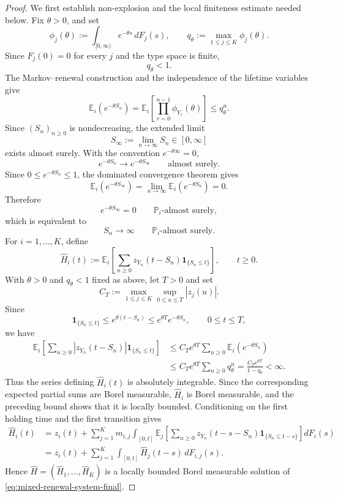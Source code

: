 \documentclass[10pt,a4paper]{amsart}
\newcommand{\E}{\mathbb E}
\newcommand{\Pbb}{\mathbb P}
\newcommand{\ind}[1]{\mathbf 1_{\{#1\}}}
\begin{document}
\begin{proof}
We first establish non-explosion and the local finiteness estimate needed below. Fix \(\theta>0\), and set
\[
  \phi_j(\theta):=
  \int_{[0,\infty)}e^{-\theta s}\,dF_j(s),
  \qquad
  q_\theta:=\max_{1\le j\le K}\phi_j(\theta).
\]
Since \(F_j(0)=0\) for every \(j\) and the type space is finite,
\[
  q_\theta<1.
\]
The Markov--renewal construction and the independence of the lifetime variables give
\[
  \E_i\left(e^{-\theta S_n}\right)
  =
  \E_i\left[
    \prod_{r=0}^{n-1}\phi_{Y_r}(\theta)
  \right]
  \le q_\theta^n.
\]
Since \((S_n)_{n\ge0}\) is nondecreasing, the extended limit
\[
  S_\infty:=\lim_{n\to\infty}S_n
  \in[0,\infty]
\]
exists almost surely. With the convention \(e^{-\theta\infty}=0\),
\[
  e^{-\theta S_n}\longrightarrow e^{-\theta S_\infty}
  \qquad\text{almost surely}.
\]
Since \(0\le e^{-\theta S_n}\le1\), the dominated convergence theorem gives
\[
  \E_i\left(e^{-\theta S_\infty}\right)
  =
  \lim_{n\to\infty}\E_i\left(e^{-\theta S_n}\right)
  =0.
\]
Therefore
\[
  e^{-\theta S_\infty}=0
  \qquad \Pbb_i\text{-almost surely},
\]
which is equivalent to
\[
  S_n\longrightarrow\infty
  \qquad \Pbb_i\text{-almost surely}.
\]
For \(i=1,\dots,K\), define
\[
  \widehat H_i(t):=
  \E_i\left[
    \sum_{n\ge0}
    z_{Y_n}(t-S_n)\ind{S_n\le t}
  \right],
  \qquad t\ge0.
\]
With \(\theta>0\) and \(q_\theta<1\) fixed as above, let \(T>0\) and set
\[
  C_T:=
  \max_{1\le j\le K}\sup_{0\le u\le T}|z_j(u)|.
\]
Since
\[
  \ind{S_n\le t}
  \le e^{\theta(t-S_n)}
  \le e^{\theta T}e^{-\theta S_n},
  \qquad 0\le t\le T,
\]
we have
\[
\begin{split}
  \E_i\left[
    \sum_{n\ge0}
    |z_{Y_n}(t-S_n)|\ind{S_n\le t}
  \right]
  &\le
  C_Te^{\theta T}
  \sum_{n\ge0}\E_i\left(e^{-\theta S_n}\right)\\
  &\le
  C_Te^{\theta T}\sum_{n\ge0}q_\theta^n
  =
  \frac{C_Te^{\theta T}}{1-q_\theta}
  <\infty.
\end{split}
\]
Thus the series defining \(\widehat H_i(t)\) is absolutely integrable. Since the corresponding expected partial sums are Borel measurable, \(\widehat H_i\) is Borel measurable, and the preceding bound shows that it is locally bounded. Conditioning on the first holding time and the first transition gives
\[
\begin{split}
  \widehat H_i(t)
  &=
  z_i(t)
  +
  \sum_{j=1}^K m_{i,j}\int_{[0,t]}
  \E_j\left[
    \sum_{n\ge0}
    z_{Y_n}(t-s-S_n)\ind{S_n\le t-s}
  \right]dF_i(s)\\
  &=
  z_i(t)
  +
  \sum_{j=1}^K
  \int_{[0,t]}\widehat H_j(t-s)\,dF_{i,j}(s).
\end{split}
\]
Hence \(\widehat H=(\widehat H_1,\dots,\widehat H_K)\) is a locally bounded Borel measurable solution of \eqref{eq:mixed-renewal-system-final}.


\end{proof}
\end{document}

